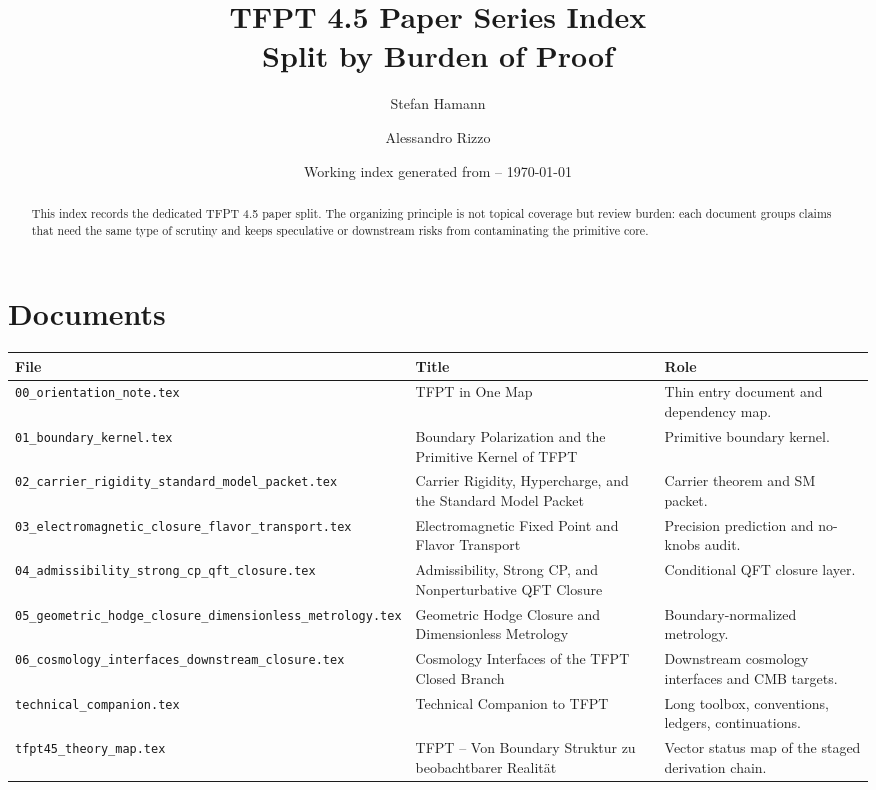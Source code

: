 \documentclass[11pt,a4paper]{article}
\title{\color{tfptblue}\textbf{TFPT 4.5 Paper Series Index}\\[0.35em]
{\Large Split by Burden of Proof}}
\author{Stefan Hamann \and Alessandro Rizzo}
\date{{\normalsize\color{tfptgray}\sffamily Working index generated from \sourceDraft{} -- \today}}
\begin{document}
\maketitle

\begin{abstract}
This index records the dedicated TFPT 4.5 paper split. The organizing principle is not topical
coverage but review burden: each document groups claims that need the same type of scrutiny and
keeps speculative or downstream risks from contaminating the primitive core.
\end{abstract}

\tableofcontents

\section{Documents}

\begin{center}
\begin{tabularx}{\textwidth}{@{}p{}p{}Y@{}}
\toprule
\textbf{File} & \textbf{Title} & \textbf{Role} \\
\midrule
\texttt{00\_orientation\_note.tex} & TFPT in One Map & Thin entry document and dependency map. \\
\texttt{01\_boundary\_kernel.tex} & Boundary Polarization and the Primitive Kernel of TFPT & Primitive boundary kernel. \\
\texttt{02\_carrier\_rigidity\_standard\_model\_packet.tex} & Carrier Rigidity, Hypercharge, and the Standard Model Packet & Carrier theorem and SM packet. \\
\texttt{03\_electromagnetic\_closure\_flavor\_transport.tex} & Electromagnetic Fixed Point and Flavor Transport & Precision prediction and no-knobs audit. \\
\texttt{04\_admissibility\_strong\_cp\_qft\_closure.tex} & Admissibility, Strong CP, and Nonperturbative QFT Closure & Conditional QFT closure layer. \\
\texttt{05\_geometric\_hodge\_closure\_dimensionless\_metrology.tex} & Geometric Hodge Closure and Dimensionless Metrology & Boundary-normalized metrology. \\
\texttt{06\_cosmology\_interfaces\_downstream\_closure.tex} & Cosmology Interfaces of the TFPT Closed Branch & Downstream cosmology interfaces and CMB targets. \\
\texttt{technical\_companion.tex} & Technical Companion to TFPT & Long toolbox, conventions, ledgers, continuations. \\
\texttt{tfpt45\_theory\_map.tex} & TFPT -- Von Boundary Struktur zu beobachtbarer Realit\"at & Vector status map of the staged derivation chain. \\
\bottomrule
\end{tabularx}
\end{center}
\end{document}
